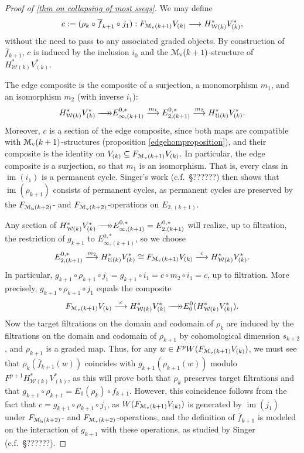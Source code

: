 \documentclass[11pt]{amsart}
\theoremstyle{plain}
\theoremstyle{definition}
\DeclareMathOperator{\im}{im}
\renewcommand{\to}{\longrightarrow}
\newcommand{\calU}{\mathcal{U}}
\newcommand{\calw}{\mathcal{W}}
\newcommand{\calMv}{\mathcal{M}_\textup{v}}
\newcommand{\calMh}{\mathcal{M}_\textup{h}}
\theoremstyle{plain}
\newcommand{\epi}{{\,\makebox[0cm][l]{\ensuremath\to}\to}}
\begin{document}
\begin{Calculations of HWn for n nonzero}
\begin{proof}[Proof of \ref{thm on collapsing of most sseqs}]
 We may define 
\[c:=(\rho_k\circ \overline{f}_{k+1}\circ j_1):F_{\calMv(k+1)}V_{(k)}\to H^*_{\calw(k)}V^*_{(k)},\]
without the need to pass to any associated graded objects. By construction of $\overline{f}_{k+1}$,  $c$ is induced by the inclusion $i_0$ and the $\calMv(k+1)$-structure of $H^*_{\calw(k)}V^*_{(k)}$.

The edge composite is the composite of a surjection, a monomorphism $m_1$, and an isomorphism $m_2$ (with inverse $i_1$):
\[H^*_{\calw(k)}V^*_{(k)}\epi E_{\infty,(k+1)}^{0,*}\overset{m_1}{\to}E_{2,(k+1)}^{0,*}\overset{m_2}{\to}H^*_{\calU(k)}V^*_{(k)}.\]
Moreover, $c$ is a section of the edge composite, since both maps are compatible with $\calMv(k+1)$-structures (proposition \ref{edgehomproposition}), and their composite is the identity on $V_{(k)}\subseteq  F_{\calMv(k+1)}V_{(k)}$.
In particular, the edge composite is a surjection, so that $m_{1}$ is an isomorphism. That is, every class in $\im(i_1)$ is a permanent cycle. Singer's work (c.f.\ \S??????) then shows that $\im(\rho_{k+1})$ consists of permanent cycles, as permanent cycles are preserved by the $F_{\calMh(k+2)}$- and $F_{\calMv(k+2)}$-operations on $E_{2,(k+1)}$.


Any section of $H^*_{\calw(k)}V^*_{(k)}\epi E_{\infty,(k+1)}^{0,*}=E_{2,(k+1)}^{0,*}$ will realize, up to filtration, the restriction of $g_{k+1}$ to $E_{\infty,(k+1)}^{0,*}$, so we choose
\[E_{2,(k+1)}^{0,*}\overset{m_2}{\to} H^*_{\calU(k)}V^*_{(k)}\cong F_{\calMv(k+1)}V_{(k)}\overset{c}{\to}H^*_{\calw(k)}V^*_{(k)}.\]
In particular, $g_{k+1}\circ \rho_{k+1}\circ j_1=g_{k+1}\circ i_1=c\circ m_2\circ i_1=c$, up to filtration. More precisely, $g_{k+1}\circ \rho_{k+1}\circ j_1$ equals the composite
\begin{gather*}
F_{\calMv(k+1)}V_{(k)}\overset{c}{\to} H^*_{\calw(k)}V^*_{(k)}\epi E_0^0(H^*_{\calw(k)}V^*_{(k)}).
\end{gather*}
Now the target filtrations on the domain and codomain of $\rho_k$ are induced by the filtrations on the domain and codomain of $\rho_{k+1}$ by cohomological dimension $s_{k+2}$, and $\rho_{k+1}$ is a graded map. Thus, for any $w\in F^pW(F_{\calMv(k+1)}V_{(k)})$, we must see that $\rho_k(\overline{f}_{k+1}(w))$ coincides with $g_{k+1}(\rho_{k+1}(w))$ modulo $F^{p+1}H^*_{\calw(k)}V^*_{(k)}$, as this will prove both that $\rho_k$ preserves target filtrations and that  $g_{k+1}\circ \rho_{k+1}=E_0(\rho_{k})\circ f_{k+1}$. However, this coincidence follows from the fact that $c=g_{k+1}\circ \rho_{k+1}\circ j_1$, as $W(F_{\calMv(k+1)}V_{(k)})$ is generated by $\im(j_1)$ under $F_{\calMh(k+2)}$- and $F_{\calMv(k+2)}$-operations, and the definition of $\overline{f}_{k+1}$ is modeled on the interaction of $g_{k+1}$ with these operations, as studied by Singer (c.f.\ \S??????).


\end{proof}
\end{Calculations of HWn for n nonzero}
\end{document}
